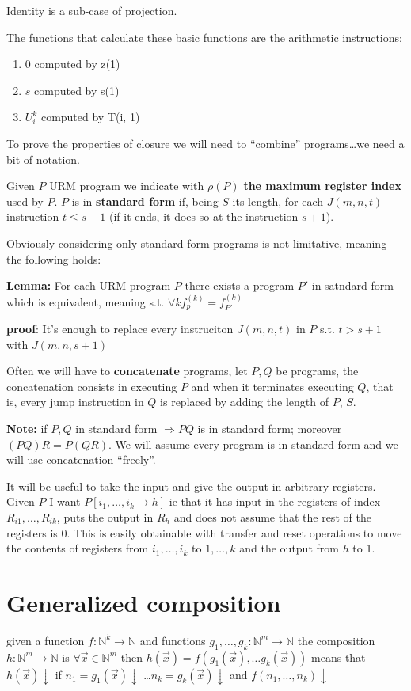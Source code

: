 \documentclass{amsbook}
\newcommand{\nat}{\ensuremath{\mathbb{N}}}
\theoremstyle{definition}
\theoremstyle{remark}
\numberwithin{section}{chapter}
\numberwithin{equation}{chapter}
\begin{document}
Identity is a sub-case of projection.

The functions that calculate these basic functions are the arithmetic instructions:
\begin{enumerate}
	\item $\underline{0}$ computed by z(1)
	\item $s$ computed by s(1)
	\item $ U_i^k$ computed by T(i, 1)
\end{enumerate}

To prove the properties of closure we will need to ``combine'' programs\dots we need a bit of notation.

Given $P$ URM program we indicate with $ \rho(P) $ \textbf{the maximum register index} used by $P$. $P$ is in \textbf{standard form} if, being $S$ its length, for each $J(m,n,t)$ instruction $t\leq s+1$ (if it ends, it does so at the instruction $s+1$).

Obviously considering only standard form programs is not limitative, meaning the following holds:

\textbf{Lemma:} For each URM program $P$ there exists a program $P'$ in satndard form which is equivalent, meaning s.t. $\forall k f_p^{(k)} = f_{P'}^{(k)}$

\textbf{proof}: It's enough to replace every instruciton $J(m,n,t)$ in $P$ s.t. $t>s+1$ with $J(m,n,s+1)$

Often we will have to \textbf{concatenate} programs, let $P, Q$ be programs, the concatenation consists in executing $P$ and when it terminates executing $Q$, that is, every jump instruction in $Q$ is replaced by adding the length of $P$, $S$.

\textbf{Note:} if $P,Q$ in standard form $\Rightarrow PQ$ is in standard form; moreover $(PQ)R = P(QR)$. We will assume every program is in standard form and we will use concatenation ``freely''.

It will be useful to take the input and give the output in arbitrary registers. Given $P$ I want $ P[i_1,\dots,i_k \rightarrow h] $ ie that it has input in the registers of index $ R_{i1},\dots,R_{ik} $, puts the output in $ R_h $ and does not assume that the rest of the registers is 0. This is easily obtainable with transfer and reset operations to move the contents of registers from $ i_1,\dots,i_k $ to $ 1,\dots,k $ and the output from $h$ to 1.

\section {Generalized composition}
given a function
$ f: \nat^k \rightarrow \nat $ and functions
$ g_1,\dots,g_k: \nat^m \rightarrow \nat $
the composition $ h: \nat^m \rightarrow \nat $
is $ \forall \vec{x} \in \nat^m $ then
$ h(\vec{x}) = f(g_1(\vec{x}), \dots g_k(\vec{x}))
$ means that $ h(\vec{x}) \downarrow $ if $ n_1 = g_1(\vec{x}) \downarrow $
\dots $ n_k = g_k(\vec{x}) \downarrow $ and $ f(n_1,\dots,n_k) \downarrow $
\end{document}
